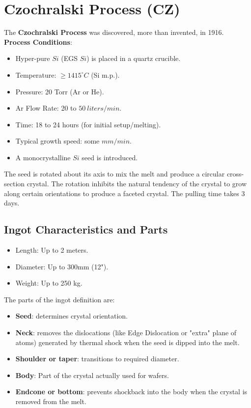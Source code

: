 \documentclass{report}
\begin{document}
\section{Czochralski Process (CZ)}

The \textbf{Czochralski Process} was discovered, more than invented, in 1916.
\textbf{Process Conditions}:
\begin{itemize}
    \item Hyper-pure $Si$ (EGS $Si$) is placed in a quartz crucible.
    \item Temperature: $\ge1415^{\circ}C$ (Si m.p.).
    \item Pressure: 20 Torr (Ar or He).
    \item Ar Flow Rate: 20 to $50~liters/min$.
    \item Time: 18 to 24 hours (for initial setup/melting).
    \item Typical growth speed: some $mm/min$.
    \item A monocrystalline $Si$ seed is introduced.
\end{itemize}
The seed is rotated about its axis to mix the melt and produce a circular cross-section crystal. The rotation inhibits the natural tendency of the crystal to grow along certain orientations to produce a faceted crystal. The pulling time takes 3 days.

\subsection{Ingot Characteristics and Parts}
\begin{itemize}
    \item Length: Up to 2 meters.
    \item Diameter: Up to 300mm (12").
    \item Weight: Up to 250 kg.
\end{itemize}
The parts of the ingot definition are:
\begin{itemize}
    \item \textbf{Seed}: determines crystal orientation.
    \item \textbf{Neck}: removes the dislocations (like Edge Dislocation or "extra" plane of atoms) generated by thermal shock when the seed is dipped into the melt.
    \item \textbf{Shoulder or taper}: transitions to required diameter.
    \item \textbf{Body}: Part of the crystal actually used for wafers.
    \item \textbf{Endcone or bottom}: prevents shockback into the body when the crystal is removed from the melt.
\end{itemize}
\end{document}
